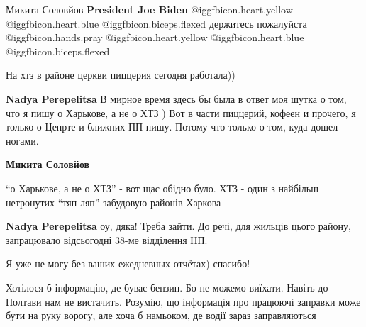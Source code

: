 \begin{itemize}
Микита Соловйов \textbf{President Joe Biden}  @igg{fbicon.heart.yellow}  @igg{fbicon.heart.blue}  @igg{fbicon.biceps.flexed}  держитесь пожалуйста  @igg{fbicon.hands.pray}  @igg{fbicon.heart.yellow}  @igg{fbicon.heart.blue}  @igg{fbicon.biceps.flexed} 

На хтз в районе церкви пиццерия сегодня работала))

\begin{itemize} %
\textbf{Nadya Perepelitsa} В мирное время здесь бы была в ответ моя шутка о том, что я пишу о Харькове, а не о ХТЗ )
Вот в части пиццерий, кофеен и прочего, я только о Ценрте и ближних ПП пишу. Потому что только о том, куда дошел ногами.

\textbf{Микита Соловйов} 

\enquote{о Харькове, а не о ХТЗ} - вот щас обідно було. ХТЗ - один з найбільш нетронутих \enquote{тяп-ляп} забудовую районів Харкова

\textbf{Nadya Perepelitsa} оу, дяка! Треба зайти. До речі, для жильців цього району, запрацювало відсьогодні 38-ме відділення НП.
\end{itemize} %

Я уже не могу без ваших ежедневных отчётах) спасибо!


Хотілося б інформацію, де буває бензин. Бо не можемо виїхати. Навіть до Полтави
нам не вистачить. Розумію, що інформація про працюючі заправки може бути на
руку ворогу, але хоча б намьоком, де водії зараз заправляються




\end{itemize} %
